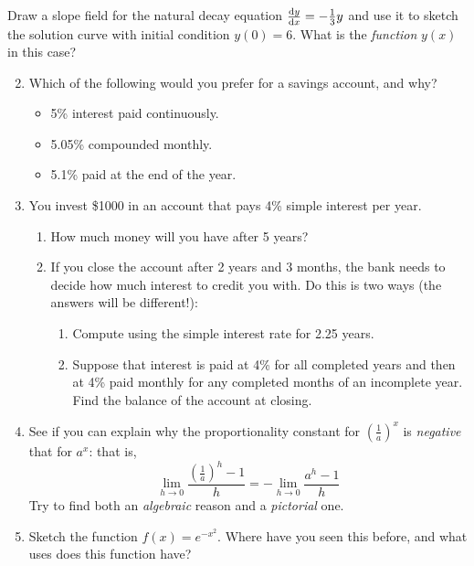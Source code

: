 \begin{exercises}{}{}
\exstart Draw a slope field for the natural decay equation $\diff[y]{x}=-\frac 13y$ and use it to sketch the solution curve with initial condition $y(0)=6$. What is the \emph{function} $y(x)$ in this case?

\begin{enumerate}\setcounter{enumi}{1}
  \item Which of the following would you prefer for a savings account, and why?
	\begin{itemize}
  	\item 5\% interest paid continuously. %
  	\item 5.05\% compounded monthly. %
  	\item 5.1\% paid at the end of the year. 
	\end{itemize}
	
   
  \item You invest \$1000 in an account that pays 4\% simple interest per year.
  \begin{enumerate}
    \item How much money will you have after 5 years?
    \item If you close the account after 2 years and 3 months, the bank needs to decide how much interest to credit you with. Do this is two ways (the answers will be different!):
    \begin{enumerate}
      \item Compute using the simple interest rate for 2.25 years.
      \item Suppose that interest is paid at 4\% for all completed years and then at 4\% paid monthly for any completed months of an incomplete year. Find the balance of the account at closing.
    \end{enumerate}
	\end{enumerate}
	
	

  \item See if you can explain why the proportionality constant for $\left(\frac 1a\right)^x$ is \emph{negative} that for $a^x$: that is,
  \[\lim_{h\to 0}\frac{(\frac 1a)^h-1}h=-\lim_{h\to 0}\frac{a^h-1}h\]
  Try to find both an \emph{algebraic} reason and a \emph{pictorial} one.
  
  \item Sketch the function $f(x)=e^{-x^2}$. Where have you seen this before, and what uses does this function have?
  
\end{enumerate}
\end{exercises}


